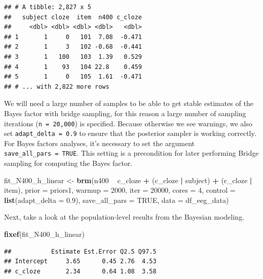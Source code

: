 \documentclass[12pt,]{krantz}
\newenvironment{Shaded}{\begin{snugshade}}{\end{snugshade}}
\newcommand{\KeywordTok}[1]{\textcolor[rgb]{0.13,0.29,0.53}{\textbf{#1}}}
\newcommand{\DataTypeTok}[1]{\textcolor[rgb]{0.13,0.29,0.53}{#1}}
\newcommand{\DecValTok}[1]{\textcolor[rgb]{0.00,0.00,0.81}{#1}}
\newcommand{\FloatTok}[1]{\textcolor[rgb]{0.00,0.00,0.81}{#1}}
\newcommand{\StringTok}[1]{\textcolor[rgb]{0.31,0.60,0.02}{#1}}
\newcommand{\OtherTok}[1]{\textcolor[rgb]{0.56,0.35,0.01}{#1}}
\newcommand{\OperatorTok}[1]{\textcolor[rgb]{0.81,0.36,0.00}{\textbf{#1}}}
\newcommand{\NormalTok}[1]{#1}
\theoremstyle{definition}
\theoremstyle{definition}
\theoremstyle{definition}
\theoremstyle{remark}
\begin{document}
\begin{verbatim}
## # A tibble: 2,827 x 5
##   subject cloze  item  n400 c_cloze
##     <dbl> <dbl> <dbl> <dbl>   <dbl>
## 1       1     0   101  7.08  -0.471
## 2       1     3   102 -0.68  -0.441
## 3       1   100   103  1.39   0.529
## 4       1    93   104 22.8    0.459
## 5       1     0   105  1.61  -0.471
## # ... with 2,822 more rows
\end{verbatim}

We will need a large number of samples to be able to get stable
estimates of the Bayes factor with bridge sampling, for this reason a
large number of sampling iterations (\texttt{n\ =\ 20,000}) is
specified. Because otherwise we see warnings, we also set
\texttt{adapt\_delta\ =\ 0.9} to ensure that the posterior sampler is
working correctly. For Bayes factors analyses, it's necessary to set the
argument \texttt{save\_all\_pars\ =\ TRUE}. This setting is a
precondition for later performing Bridge sampling for computing the
Bayes factor.

\begin{Shaded}
\begin{Highlighting}[]
\NormalTok{fit_N400_h_linear <-}\StringTok{ }\KeywordTok{brm}\NormalTok{(n400 }\OperatorTok{~}\StringTok{ }\NormalTok{c_cloze }\OperatorTok{+}\StringTok{ }
\StringTok{        }\NormalTok{(c_cloze }\OperatorTok{|}\StringTok{ }\NormalTok{subject) }\OperatorTok{+}\StringTok{ }\NormalTok{(c_cloze }\OperatorTok{|}\StringTok{ }\NormalTok{item), }
        \DataTypeTok{prior   =}\NormalTok{ priors1,}
        \DataTypeTok{warmup  =} \DecValTok{2000}\NormalTok{,}
        \DataTypeTok{iter    =} \DecValTok{20000}\NormalTok{,}
        \DataTypeTok{cores   =} \DecValTok{4}\NormalTok{,}
        \DataTypeTok{control =} \KeywordTok{list}\NormalTok{(}\DataTypeTok{adapt_delta =} \FloatTok{0.9}\NormalTok{),}
        \DataTypeTok{save_all_pars =} \OtherTok{TRUE}\NormalTok{,}
        \DataTypeTok{data    =}\NormalTok{ df_eeg_data)}
\end{Highlighting}
\end{Shaded}

Next, take a look at the population-level results from the Bayesian
modeling.

\begin{Shaded}
\begin{Highlighting}[]
\KeywordTok{fixef}\NormalTok{(fit_N400_h_linear)}
\end{Highlighting}
\end{Shaded}

\begin{verbatim}
##           Estimate Est.Error Q2.5 Q97.5
## Intercept     3.65      0.45 2.76  4.53
## c_cloze       2.34      0.64 1.08  3.58
\end{verbatim}
\end{document}
